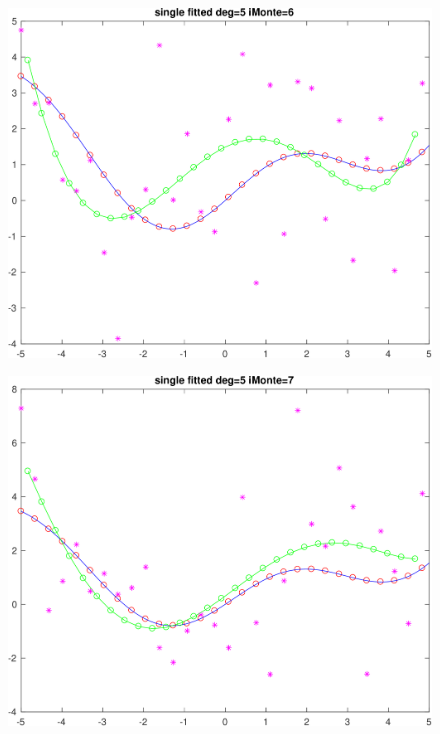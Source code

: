 \documentclass[11pt]{article}
\begin{document}
\begin{figure}[h!]
\centering\includegraphics[scale=0.1]{single_poly_d_5_iMonte_6.png}
\end{figure}

\begin{figure}[h!]
\centering\includegraphics[scale=0.1]{single_poly_d_5_iMonte_7.png}
\end{figure}
\end{document}
